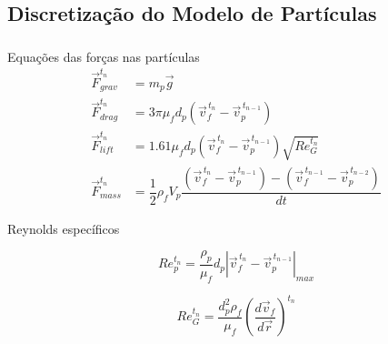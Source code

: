 \documentclass{beamer}
\begin{document}
\subsection{Discretização do Modelo de Partículas}
\begin{frame}
  \frametitle{\subsecname}
  
  \begin{block}{Equações das forças nas partículas}
      \vspace*{-\baselineskip}\setlength\belowdisplayshortskip{0pt} %
      \begin{align*}
	\vec{F}_{grav}^{t_n} &= m_p \vec{g} \\
	\vec{F}_{drag}^{t_n} &= 3 \pi \mu_f d_p \left(\vec{v}_{f}^{\,t_n} - \vec{v}_{p}^{\,t_{n-1}} \right) \\
	\vec{F}_{lift}^{t_n}\ \ &= 1.61 \mu_f d_p \left(\vec{v}_{f}^{\,t_n} - \vec{v}_{p}^{\,t_{n-1}} \right) \sqrt{{Re}_G^{t_n}} \\
	\vec{F}_{mass}^{t_n} &= \dfrac{1}{2} \rho_f V_p \dfrac{\left(\vec{v}_{f}^{\,t_n} - \vec{v}_{p}^{\,t_{n-1}}\right) -
	\left(\vec{v}_{f}^{\,t_{n-1}} - \vec{v}_{p}^{\,t_{n-2}} \right)}{dt}
      \end{align*}
  \end{block}

  \begin{block}{Reynolds específicos}
    \begin{minipage}{.35\textwidth}
      \vspace*{-\baselineskip}\setlength\belowdisplayshortskip{0pt} %
      \begin{equation*}
	  Re_{p}^{t_n} = \dfrac{\rho_p}{\mu_f} d_{p} \left|\vec{v}_{f}^{\,t_n} - \vec{v}_{p}^{\,t_{n-1}} \right|_{max}
      \end{equation*}
    \end{minipage}
    \hspace{5pt}
    \begin{minipage}{.55\textwidth}
      \begin{equation*}
	  Re_G^{t_n} = \dfrac{d_p^2 \rho_f}{\mu_f} \left( \dfrac{d\vec{v}_f}{d\vec{r}} \right)^{t_n}
      \end{equation*}
    \end{minipage}
  \end{block}
\end{frame}

\end{document}
